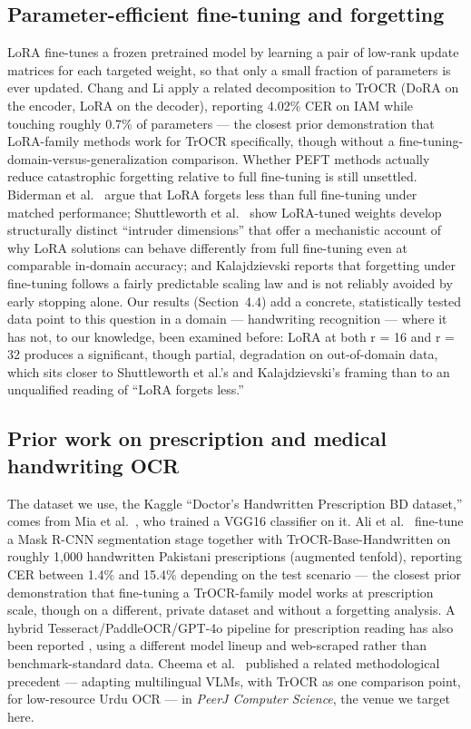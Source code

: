 \documentclass[12pt]{article}
\begin{document}
\subsection{Parameter-efficient fine-tuning and forgetting}

LoRA \citep{Hu2022LoRA} fine-tunes a frozen pretrained model by learning a pair of low-rank update matrices
for each targeted weight, so that only a small fraction of parameters is ever updated. Chang and
Li \citep{ChangLi2024DLoRA} apply a related decomposition to TrOCR (DoRA on the encoder, LoRA on the
decoder), reporting 4.02\% CER on IAM while touching roughly 0.7\% of parameters --- the closest prior
demonstration that LoRA-family methods work for TrOCR specifically, though without a
fine-tuning-domain-versus-generalization comparison. Whether PEFT methods actually reduce catastrophic
forgetting relative to full fine-tuning is still unsettled. Biderman et al.\
\citep{Biderman2024LoRALearnsLess} argue that LoRA forgets less than full fine-tuning under matched
performance; Shuttleworth et al.\ \citep{Shuttleworth2025Illusion} show LoRA-tuned weights develop
structurally distinct ``intruder dimensions'' that offer a mechanistic account of why LoRA solutions can
behave differently from full fine-tuning even at comparable in-domain accuracy; and Kalajdzievski
\citep{Kalajdzievski2024Scaling} reports that forgetting under fine-tuning follows a fairly predictable
scaling law and is not reliably avoided by early stopping alone. Our results (Section~4.4) add a concrete,
statistically tested data point to this question in a domain --- handwriting recognition --- where it has
not, to our knowledge, been examined before: LoRA at both r = 16 and r = 32 produces a significant, though
partial, degradation on out-of-domain data, which sits closer to Shuttleworth et al.'s and Kalajdzievski's
framing than to an unqualified reading of ``LoRA forgets less.''

\subsection{Prior work on prescription and medical handwriting OCR}

The dataset we use, the Kaggle ``Doctor's Handwritten Prescription BD dataset,'' comes from Mia et
al.\ \citep{Mia2024KaggleRx}, who trained a VGG16 classifier on it. Ali et al.\
\citep{Ali2024Prescription} fine-tune a Mask R-CNN segmentation stage together with TrOCR-Base-Handwritten
on roughly 1{,}000 handwritten Pakistani prescriptions (augmented tenfold), reporting CER between 1.4\% and
15.4\% depending on the test scenario --- the closest prior demonstration that fine-tuning a TrOCR-family
model works at prescription scale, though on a different, private dataset and without a
forgetting analysis. A hybrid
Tesseract/PaddleOCR/GPT-4o pipeline for prescription reading has also been
reported \citep{FrontiersMed2026Hybrid}, using a different model lineup and web-scraped rather than
benchmark-standard data. Cheema et al.\ \citep{Cheema2024PeerJUrdu} published a related methodological
precedent --- adapting multilingual VLMs, with TrOCR as one comparison point, for low-resource Urdu OCR ---
in \textit{PeerJ Computer Science}, the venue we target here.
\end{document}
